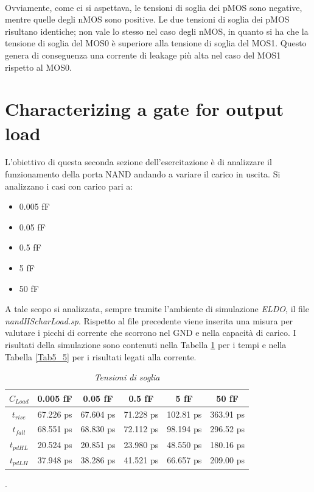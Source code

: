 \\
Ovviamente, come ci si aspettava, le tensioni di soglia dei pMOS sono negative, mentre quelle degli nMOS sono positive. Le due tensioni di soglia dei pMOS risultano identiche; non vale lo stesso nel caso degli nMOS, in quanto si ha che la tensione di soglia del MOS0 è superiore alla tensione di soglia del MOS1. Questo genera di conseguenza una corrente di leakage più alta nel caso del MOS1 rispetto al MOS0.

\section{Characterizing a gate for output load}
L'obiettivo di questa seconda sezione dell'esercitazione è di analizzare il funzionamento della porta NAND andando a variare il carico in uscita. Si analizzano i casi con carico pari a:
\begin{itemize}
	\item 0.005 fF
	\item 0.05 fF
	\item 0.5 fF
	\item 5 fF
	\item 50 fF	
\end{itemize}
A tale scopo si analizzata, sempre tramite l'ambiente di simulazione \textit{ELDO}, il file \textit{nandHScharLoad.sp}. Rispetto al file precedente viene inserita una misura per valutare i picchi di corrente che scorrono nel GND e nella capacità di carico. I risultati della simulazione sono contenuti nella Tabella \ref{Tab5_4} per i tempi e nella Tabella \ref{Tab5_5} per i risultati legati alla corrente.
\begin{table}[!h]\footnotesize
	\centering
	\begin{tabular}{|c|c|c|c|c|c|}
		\hline
		\textbf{$C_{Load}$} & \textbf{0.005 fF} & \textbf{0.05 fF} & \textbf{0.5 fF} & \textbf{5 fF} & \textbf{50 fF}\\
		\hline
		$t_{rise}$ &67.226 ps &67.604 ps &71.228 ps &102.81 ps &363.91 ps \\
		
		$t_{fall}$ &68.551 ps &68.830 ps &72.112 ps &98.194 ps &296.52 ps \\
		
		$t_{pdHL}$&20.524 ps &20.851 ps &23.980 ps &48.550 ps &180.16 ps \\
		
		$t_{pdLH}$ &37.948 ps&38.286 ps &41.521 ps &66.657 ps &209.00 ps \\
		
		\hline
	\end{tabular}
	\caption{\textit{Tensioni di soglia}}
	\label{Tab5_4}
\end{table}.
